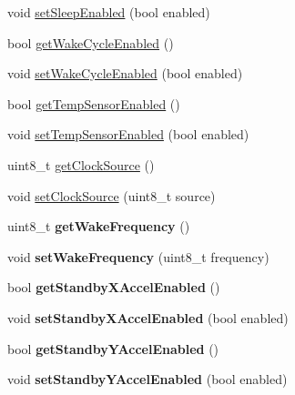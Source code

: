 \begin{DoxyCompactItemize}
\item 
void \hyperlink{class_m_p_u6050_a15ec5f8e7daf235f507c1d8b96af051a}{set\+Sleep\+Enabled} (bool enabled)
\item 
bool \hyperlink{class_m_p_u6050_a89afc5235b9088c696e2cc7841f5259a}{get\+Wake\+Cycle\+Enabled} ()
\item 
void \hyperlink{class_m_p_u6050_a340eade71cf6286f6904c2021330944e}{set\+Wake\+Cycle\+Enabled} (bool enabled)
\item 
bool \hyperlink{class_m_p_u6050_a31f588beab6760258212c65725eba336}{get\+Temp\+Sensor\+Enabled} ()
\item 
void \hyperlink{class_m_p_u6050_a0113871802e88c80fe69ce1f607987ff}{set\+Temp\+Sensor\+Enabled} (bool enabled)
\item 
uint8\+\_\+t \hyperlink{class_m_p_u6050_a8ed670258a805807b5102cdc5d0996a8}{get\+Clock\+Source} ()
\item 
void \hyperlink{class_m_p_u6050_a4c1cd147d038e024bdeaa053c4d77734}{set\+Clock\+Source} (uint8\+\_\+t source)
\item 
\hypertarget{class_m_p_u6050_a249a905ae4572a462414f2d94236258a}{uint8\+\_\+t {\bfseries get\+Wake\+Frequency} ()}\label{class_m_p_u6050_a249a905ae4572a462414f2d94236258a}

\item 
\hypertarget{class_m_p_u6050_a62495e89f4787e6b18f0f795cef2b7cd}{void {\bfseries set\+Wake\+Frequency} (uint8\+\_\+t frequency)}\label{class_m_p_u6050_a62495e89f4787e6b18f0f795cef2b7cd}

\item 
\hypertarget{class_m_p_u6050_a99261a04739fdb7a9a1c5b67ce3e710e}{bool {\bfseries get\+Standby\+X\+Accel\+Enabled} ()}\label{class_m_p_u6050_a99261a04739fdb7a9a1c5b67ce3e710e}

\item 
\hypertarget{class_m_p_u6050_af4df87fd2e87f41d06706cfd5bbc2a2c}{void {\bfseries set\+Standby\+X\+Accel\+Enabled} (bool enabled)}\label{class_m_p_u6050_af4df87fd2e87f41d06706cfd5bbc2a2c}

\item 
\hypertarget{class_m_p_u6050_a104f2ec438d745f8fdeec202bae09b48}{bool {\bfseries get\+Standby\+Y\+Accel\+Enabled} ()}\label{class_m_p_u6050_a104f2ec438d745f8fdeec202bae09b48}

\item 
\hypertarget{class_m_p_u6050_a7ce7d3299479eb66518acf0697132835}{void {\bfseries set\+Standby\+Y\+Accel\+Enabled} (bool enabled)}\label{class_m_p_u6050_a7ce7d3299479eb66518acf0697132835}


\end{DoxyCompactItemize}
